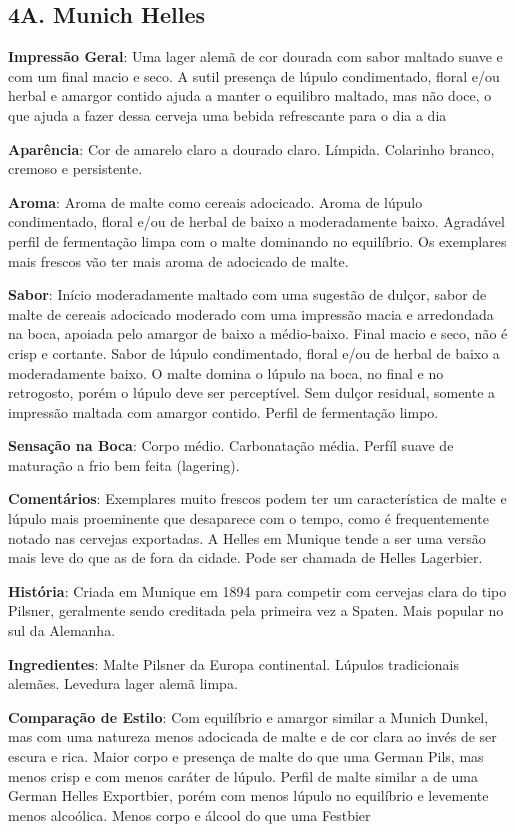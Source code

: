 \subsection*{4A. Munich Helles}

\textbf{Impressão Geral}: Uma lager alemã de cor dourada com sabor maltado suave e com um final macio e seco. A sutil presença de lúpulo condimentado, floral e/ou herbal e amargor contido ajuda a manter o equilibro maltado, mas não doce, o que ajuda a fazer dessa cerveja uma bebida refrescante para o dia a dia

\textbf{Aparência}: Cor de amarelo claro a dourado claro. Límpida. Colarinho branco, cremoso e persistente.

\textbf{Aroma}: Aroma de malte como cereais adocicado. Aroma de lúpulo condimentado, floral e/ou de herbal de baixo a moderadamente baixo. Agradável perfil de fermentação limpa com o malte dominando no equilíbrio. Os exemplares mais frescos vão ter mais aroma de adocicado de malte.

\textbf{Sabor}: Início moderadamente maltado com uma sugestão de dulçor, sabor de malte de cereais adocicado moderado com uma impressão macia e arredondada na boca, apoiada pelo amargor de baixo a médio-baixo. Final macio e seco, não é crisp e cortante. Sabor de lúpulo condimentado, floral e/ou de herbal de baixo a moderadamente baixo. O malte domina o lúpulo na boca, no final e no retrogosto, porém o lúpulo deve ser perceptível. Sem dulçor residual, somente a impressão maltada com amargor contido. Perfil de fermentação limpo.

\textbf{Sensação na Boca}: Corpo médio. Carbonatação média. Perfíl suave de maturação a frio bem feita (lagering).

\textbf{Comentários}: Exemplares muito frescos podem ter um característica de malte e lúpulo mais proeminente que desaparece com o tempo, como é frequentemente notado nas cervejas exportadas. A Helles em Munique tende a ser uma versão mais leve do que as de fora da cidade. Pode ser chamada de Helles Lagerbier.

\textbf{História}: Criada em Munique em 1894 para competir com cervejas clara do tipo Pilsner, geralmente sendo creditada pela primeira vez a Spaten. Mais popular no sul da Alemanha.

\textbf{Ingredientes}: Malte Pilsner da Europa continental. Lúpulos tradicionais alemães. Levedura lager alemã limpa.

\textbf{Comparação de Estilo}: Com equilíbrio e amargor similar a Munich Dunkel, mas com uma natureza menos adocicada de malte e de cor clara ao invés de ser escura e rica. Maior corpo e presença de malte do que uma German Pils, mas menos crisp e com menos caráter de lúpulo. Perfil de malte similar a de uma German Helles Exportbier, porém com menos lúpulo no equilíbrio e levemente menos alcoólica. Menos corpo e álcool do que uma Festbier

